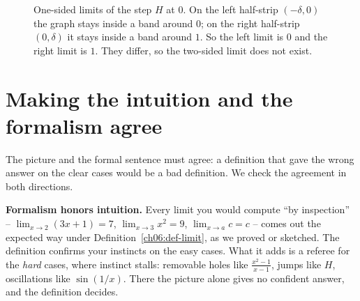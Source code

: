 \begin{figure}[htbp]
\centering
{}
\caption{One-sided limits of the step $H$ at $0$. On the left half-strip
$(-\delta,0)$ the graph stays inside a band around $0$; on the right half-strip
$(0,\delta)$ it stays inside a band around $1$. So the left limit is $0$ and the
right limit is $1$. They differ, so the two-sided limit does not exist.}
\label{ch06:fig-one-sided}
\end{figure}

\section{Making the intuition and the formalism agree}
\label{ch06:agree}

The picture and the formal sentence must agree: a definition that gave the
wrong answer on the clear cases would be a bad definition. We check the
agreement in both directions.

\textbf{Formalism honors intuition.} Every limit you would compute ``by
inspection'' -- $\lim_{x\to2}(3x+1)=7$, $\lim_{x\to3}x^2=9$, $\lim_{x\to a}c=c$ --
comes out the expected way under Definition~\ref{ch06:def-limit}, as we proved or
sketched. The definition confirms your instincts on the easy cases. What it adds
is a referee for the \emph{hard} cases, where instinct stalls: removable holes like $\frac{x^2-1}{x-1}$, jumps like $H$,
oscillations like $\sin(1/x)$. There the picture alone gives no confident answer,
and the definition decides.


